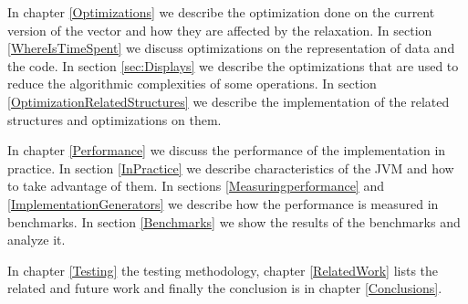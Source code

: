 In chapter \ref{Optimizations} we describe the optimization done on the current version of the vector and how they are affected by the relaxation. In section \ref{WhereIsTimeSpent} we discuss optimizations on the representation of data and the code. In section \ref{sec:Displays} we describe the optimizations that are used to reduce the algorithmic complexities of some operations. In section \ref{OptimizationRelatedStructures} we describe the implementation of the related structures and optimizations on them.

In chapter \ref{Performance} we discuss the performance of the implementation in practice. In section \ref{InPractice} we describe characteristics of the JVM and how to take advantage of them. In sections \ref{Measuringperformance} and \ref{ImplementationGenerators} we describe how the performance is measured in benchmarks. In section \ref{Benchmarks} we show  the results of the benchmarks and analyze it.

In chapter \ref{Testing} the testing methodology, chapter \ref{RelatedWork} lists the related and future work and finally the conclusion is in chapter \ref{Conclusions}.




